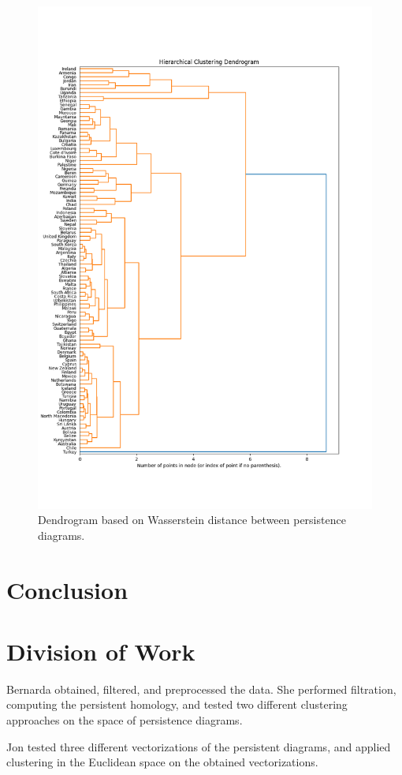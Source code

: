 \documentclass[12pt]{article}
\begin{document}
\begin{figure}[t]
	\centering
	\includegraphics[width=15cm]{wasserstein.png}
	\caption{Dendrogram based on Wasserstein distance between persistence diagrams.}
\end{figure}

\section{Conclusion}


\section{Division of Work}
Bernarda obtained, filtered, and preprocessed the data. She performed filtration, computing the persistent homology, and tested two different clustering approaches on the space of persistence diagrams.

Jon tested three different vectorizations of the persistent diagrams, and applied clustering in the Euclidean space on the obtained vectorizations. 
	
	
\end{document}
